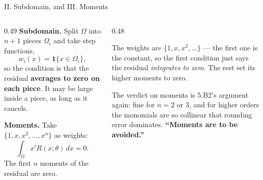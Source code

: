 \begin{frame}{II. Subdomain, and III. Moments}
\begin{columns}[T]
\begin{column}{0.49\textwidth}
\small
\textbf{Subdomain.} Split $\Omega$ into $n+1$ pieces $\Omega_i$ and take step functions,
\[
  w_i(x)=\mathbf{1}\{x\in\Omega_i\},
\]
so the condition is that the residual \textbf{averages to zero on each piece}. It may be large inside a piece, as long as it cancels.
\medskip

\textbf{Moments.} Take $\{1,x,x^{2},\dots,x^{n}\}$ as weights:
\[
  \int_{\Omega}x^{i}R(x;\theta)\,dx=0 .
\]
The first $n$ moments of the residual are zero.
\end{column}
\begin{column}{0.48\textwidth}
\begin{cautionbox}[title=\textbf{Read it carefully}]\footnotesize
The weights are $\{1,x,x^{2},\dots\}$ --- the first one is the constant, so the first condition just says the residual \emph{integrates to zero}. The rest set its higher moments to zero.
\end{cautionbox}
\medskip
\begin{examplebox}\footnotesize
The verdict on moments is 5.B2's argument again: fine for $n=2$ or $3$, and for higher orders the monomials are so collinear that rounding error dominates. \textbf{``Moments are to be avoided.''}
\end{examplebox}
\end{column}
\end{columns}
\vspace{1mm}
\end{frame}


